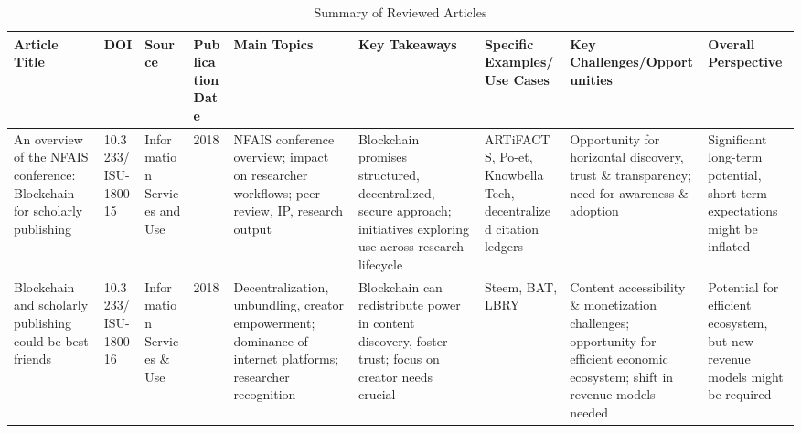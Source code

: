 \documentclass[final]{rc-book-2.14}
\begin{document}
\begin{landscape}
    \begin{table}[ht]
        \centering
        \caption{Summary of Reviewed Articles}
        \label{table:reviewed_articles}

        \renewcommand{\arraystretch}{1.4}
        \begin{tabularx}{\linewidth}{|p{3.5cm}|p{2.5cm}|p{3cm}|p{1.8cm}|X|X|X|X|X|}
            \hline
            \textbf{Article Title}                                                                                                             & \textbf{DOI}                  & \textbf{Source}                                                & \textbf{Publication Date} & \textbf{Main Topics}                                                                                                        & \textbf{Key Takeaways}                                                                                                                         & \textbf{Specific Examples/Use Cases}                                                                    & \textbf{Key Challenges/Opportunities}                                                                                               & \textbf{Overall Perspective}                                                                          \\
            \hline
            An overview of the NFAIS conference: Blockchain for scholarly publishing                                                           & 10.3233/ISU-180015            & Information Services and Use                                   & 2018                      & NFAIS conference overview; impact on researcher workflows; peer review, IP, research output                                 & Blockchain promises structured, decentralized, secure approach; initiatives exploring use across research lifecycle                            & ARTiFACTS, Po-et, Knowbella Tech, decentralized citation ledgers                                        & Opportunity for horizontal discovery, trust \& transparency; need for awareness \& adoption                                         & Significant long-term potential, short-term expectations might be inflated                            \\
            \hline
            Blockchain and scholarly publishing could be best friends                                                                          & 10.3233/ISU-180016            & Information Services \& Use                                    & 2018                      & Decentralization, unbundling, creator empowerment; dominance of internet platforms; researcher recognition                  & Blockchain can redistribute power in content discovery, foster trust; focus on creator needs crucial                                           & Steem, BAT, LBRY                                                                                        & Content accessibility \& monetization challenges; opportunity for efficient economic ecosystem; shift in revenue models needed      & Potential for efficient ecosystem, but new revenue models might be required                           \\

\end{tabularx}
\end{table}
\end{landscape}
\end{document}
